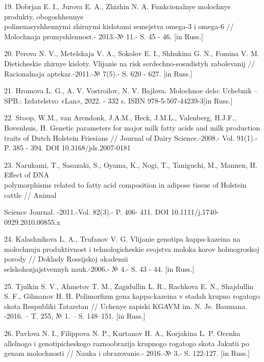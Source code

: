 \begin{noparindent}
19. Dobrjan E. I., Jurova E. A., Zhizhin N. A.
Funkcional\textquotesingle nye molochnye produkty, obogoshhennye
\\polinenasyshhennymi zhirnymi kislotami semejstva omega-3 i omega-6 //
Molochnaja promyshlennost\textquotesingle.- 2013.-№ 11.- S. 45 - 46.
{[}in Russ.{]}

20. Perova N. V., Metel\textquotesingle skaja V. A., Sokolov E. I.,
Shhukina G. N., Fomina V. M. Dieticheskie zhirnye kisloty. Vlijanie na
risk serdechno-sosudistyh zabolevanij // Racional\textquotesingle naja
aptekar\textquotesingle.-2011.-№ 7(5).- S. 620 - 627. {[}in Russ.{]}

21. Hromova L. G., A. V. Vostroilov, N. V. Bajlova. Molochnoe delo:
Uchebnik -- SPB.: Izdatel\textquotesingle stvo «Lan\textquotesingle»,
2022. - 332 s. ISBN 978-5-507-44239-3{[}in Russ.{]}

22. Stoop, W.M., van Arendonk, J.A.M., Heck, J.M.L., Valenberg, H.J.F.,
Bovenhuis, H. Genetic parameters for major milk fatty acids and milk
production traits of Dutch Holstein Friesians // Journal of Dairy
Science.-2008.- Vol. 91(1).-P. 385 - 394. DOI 10.3168/jds.2007-0181

23. Narukami, T., Sasazaki, S., Oyama, K., Nogi, T., Taniguchi, M.,
Mannen, H. Effect of DNA \\polymorphisms related to fatty acid composition
in adipose tissue of Holstein cattle // Animal

Science Journal. -2011.-Vol. 82(3).- P. 406- 411. DOI
10.1111/j.1740-0929.2010.00855.x

24. Kalashnikova L. A., Trufanov V. G. Vlijanie genotipa kappa-kazeina
na molochnuju produktivnost\textquotesingle{} i tehnologicheskie
svojstva moloka korov holmogroskoj porody // Doklady Rossijskoj akademii
\\sel\textquotesingle skohozjajstvennyh nauk.-2006.- № 4.- S. 43 - 44.
{[}in Russ.{]}

25. Tjul\textquotesingle kin S. V., Ahmetov T. M., Zagidullin L. R.,
Rachkova E. N., Shajdullin S. F., Gil\textquotesingle manov H. H.
Polimorfizm gena kappa-kazeina v stadah krupno rogatogo skota Respubliki
Tatarstan // Uchenye zapiski KGAVM im. N. Je. Baumana. -2016. -- T. 255,
№ 1. -- S. 148--151. {[}in Russ.{]}

26. Pavlova N. I., Filippova N. P., Kurtanov H. A., Korjakina L. P.
Ocenka allel\textquotesingle nogo i genotipicheskogo raznoobrazija
krupnogo rogatogo skota Jakutii po genam molochnosti // Nauka i
obrazovanie.- 2016.-№ 3.- S. 122-127. {[}in Russ.{]}


\end{noparindent}
